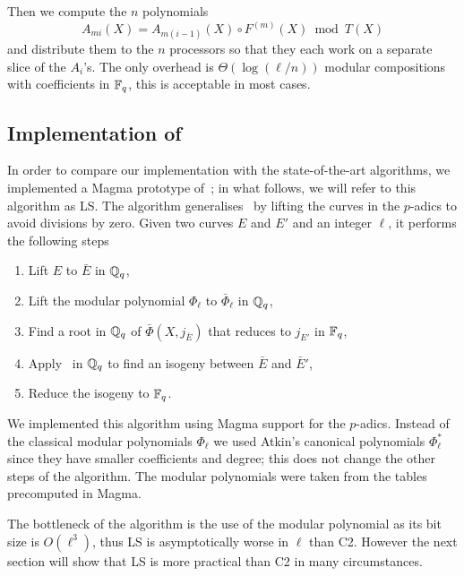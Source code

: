 Then we compute the $n$ polynomials
\begin{equation*}
  A_{mi}(X) = A_{m(i-1)}(X) \circ F^{(m)}(X) \bmod T(X)
\end{equation*}
and distribute them to the $n$ processors so that they each work on a
separate slice of the $A_i$'s. The only overhead is $\Theta(\log
(\ell/n))$ modular compositions with coefficients in $\mathbb{F}_q$, this is
acceptable in most cases.


\subsection{Implementation of~\cite{LeSi09}}
In order to compare our implementation with the state-of-the-art
algorithms, we implemented a Magma prototype of~\cite{LeSi09}; in what
follows, we will refer to this algorithm as LS. The algorithm
generalises~\cite{BoMoSaSc08} by lifting the curves in the $p$-adics
to avoid divisions by zero. Given two curves $E$ and $E'$ and an
integer $\ell$, it performs the following steps
\begin{enumerate}
\item Lift $E$ to $\bar{E}$ in $\mathbb{Q}_q$,
\item Lift the modular polynomial $\Phi_\ell$ to $\bar{\Phi}_\ell$ in
  $\mathbb{Q}_q$,
\item Find a root in $\mathbb{Q}_q$ of $\bar{\Phi}(X,j_{\bar{E}})$ that
  reduces to $j_{E'}$ in $\mathbb{F}_q$,
\item Apply~\cite{BoMoSaSc08} in $\mathbb{Q}_q$ to find an isogeny between
  $\bar{E}$ and $\bar{E}'$,
\item Reduce the isogeny to $\mathbb{F}_q$.
\end{enumerate}

We implemented this algorithm using Magma support for the
$p$-adics. Instead of the classical modular polynomials $\Phi_\ell$ we
used Atkin's canonical polynomials $\Phi^\ast_\ell$ since they have
smaller coefficients and degree; this does not change the other steps
of the algorithm. The modular polynomials were taken from the tables
precomputed in Magma.

The bottleneck of the algorithm is the use of the modular polynomial
as its bit size is $O(\ell^3)$, thus LS is asymptotically worse in
$\ell$ than C2. However the next section will show that LS is more
practical than C2 in many circumstances.



%
